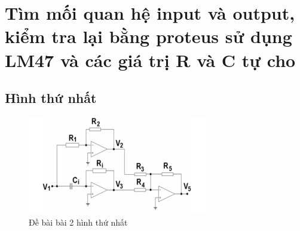 \section{Tìm mối quan hệ input và output, kiểm tra lại bằng proteus sử dụng LM47 và các giá trị R và C tự cho}
    \subsection{Hình thứ nhất}
        \begin{figure}[H]
            \centering
            \includegraphics[width=0.7\textwidth]{pictures/topic2_a.png}
            \caption{Đề bài bài 2 hình thứ nhất}					
            \label{fig:circuit_simulation}
        \end{figure}
